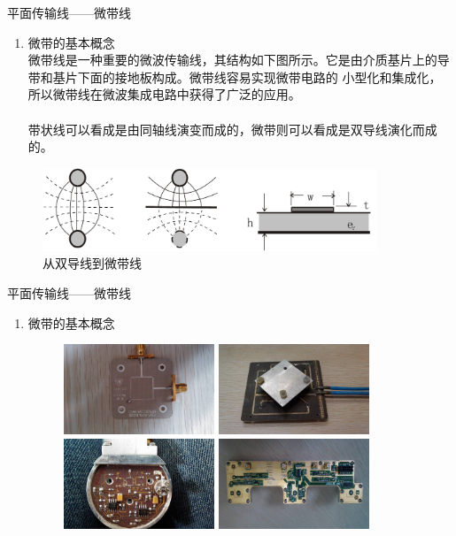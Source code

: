 \begin{frame}{平面传输线——微带线}
    \begin{enumerate}
        \item 微带的基本概念\\
              微带线是一种重要的微波传输线，其结构如下图所示。它是由介质基片上的导带和基片下面的接地板构成。微带线容易实现微带电路的
              小型化和集成化，所以微带线在微波集成电路中获得了广泛的应用。 \\
              \hspace*{\fill}\\
              带状线可以看成是由同轴线演变而成的，微带则可以看成是双导线演化而成的。
    \end{enumerate}
    \begin{figure}
        \includegraphics[width=10cm]{Cha6//fig6-38.png}
        \caption{从双导线到微带线}
    \end{figure}
\end{frame}

\begin{frame}{平面传输线——微带线}
    \begin{enumerate}
        \item 微带的基本概念\\
        \begin{figure}
            \includegraphics[width=4.5cm]{Cha6//fig6-47.jpg}
            \includegraphics[width=4.5cm]{Cha6//fig6-48.jpg}\\
            \includegraphics[width=4.5cm]{Cha6//fig6-49.jpg}
            \includegraphics[width=4.5cm]{Cha6//fig6-50.jpg}
        \end{figure}
    \end{enumerate}
\end{frame}


